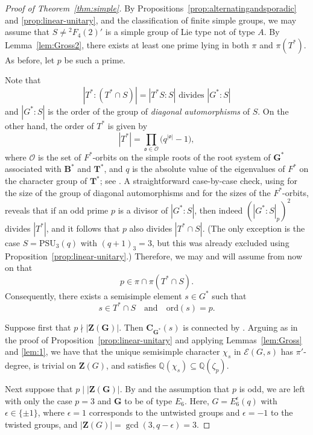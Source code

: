 \documentclass[12pt]{amsart}
\theoremstyle{definition}
\numberwithin{equation}{section}
\newcommand{\PSU}{{\mathrm {PSU}}}
\newcommand{\ord}{{\mathrm {ord}}}
\newcommand{\QQ}{{\mathbb Q}}
\newcommand{\EC}{\mathcal{E}}
\newcommand{\bC}{{\mathbf{C}}}
\newcommand{\bG}{{\mathbf{G}}}
\newcommand{\bT}{{\mathbf{T}}}
\newcommand{\bB}{{\mathbf{B}}}
\newcommand{\bZ}{{\mathbf{Z}}}
\begin{document}
\begin{proof}[Proof of Theorem~\ref{thm:simple}]
By Propositions~\ref{prop:alternatingandsporadic} and
\ref{prop:linear-unitary}, and the classification of finite simple
groups, we may assume that $S \neq {}^2F_4(2)'$ is a simple group of
Lie type not of type $A$. By Lemma~\ref{lem:Gross2}, there exists at
least one prime lying in both $\pi$ and $\pi(T^*)$. As before, let
$p$ be such a prime.

Note that
\[
|T^*:(T^*\cap S)| = |T^*S:S| \text{ divides } |G^*:S|
\]
and $|G^*:S|$ is the order of the group of \emph{diagonal
automorphisms} of $S$. On the other hand, the order of $T^*$ is
given by
\[
|T^*|=\prod_{\mathfrak{o}\in \mathcal{O}}
\bigl(q^{|\mathfrak{o}|}-1\bigr),
\]
where $\mathcal{O}$ is the set of $F^*$-orbits on the simple roots
of the root system of $\bG^*$ associated with $\bB^*$ and $\bT^*$,
and $q$ is the absolute value of the eigenvalues of $F^*$ on the
character group of $\bT^*$; see \cite[p.~74]{Carter85}. A
straightforward case-by-case check, using \cite[Table~5]{Atl1} for
the size of the group of diagonal automorphisms and
\cite[\S1.19]{Carter85} for the sizes of the $F^*$-orbits, reveals
that if an odd prime $p$ is a divisor of $|G^*:S|$, then indeed
$(|G^*:S|_p)^2$ divides $|T^*|$, and it follows that $p$ also
divides $|T^*\cap S|$. (The only exception is the case $S=\PSU_3(q)$
with $(q+1)_3=3$, but this was already excluded using
Proposition~\ref{prop:linear-unitary}.) Therefore, we may and will
assume from now on that \[p\in \pi\cap \pi(T^*\cap S).\]
Consequently, there exists a semisimple element $s\in G^*$ such that
\[
s\in T^*\cap S \quad\text{and}\quad \ord(s)=p.
\]

Suppose first that $p\nmid |\bZ(\bG)|$. Then $\bC_{\bG^*}(s)$ is
connected by \cite[Corollary~4.6]{Borel70}. Arguing as in the proof
of Proposition~\ref{prop:linear-unitary} and applying
Lemmas~\ref{lem:Gross} and \ref{lem:1}, we have that the unique
semisimple character $\chi_s$ in $\EC(G,s)$ has $\pi'$-degree, is
trivial on $\bZ(G)$, and satisfies $\QQ(\chi_s)\subseteq
\QQ(\zeta_p)$.

Next suppose that $p\mid |\bZ(\bG)|$. By
\cite[Theorem~1.12.5]{GLS98} and the assumption that $p$ is odd, we
are left with only the case $p=3$ and $\bG$ to be of type $E_6$.
Here, $G=E_6^\epsilon(q)$ with $\epsilon\in\{\pm1\}$, where
$\epsilon=1$ corresponds to the untwisted groups and $\epsilon=-1$
to the twisted groups, and $|\bZ(G)|=\gcd(3,q-\epsilon)=3$.


\end{proof}
\end{document}
